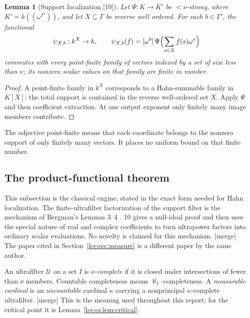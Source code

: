 \documentclass[11pt,letterpaper]{article}
\numberwithin{equation}{section}
\newtheorem{lemma}[theorem]{Lemma}
\theoremstyle{definition}
\theoremstyle{remark}
\newcommand{\coef}[2]{[\omega^{#1}]\,#2}
\newcommand{\leref}[1]{Lemma~\ref{#1}}
\newcommand{\src}[1]{\textup{\textsf{\small[#1]}}}%
\newcommand{\mergetag}{\textup{\textsf{\small[merge]}}}%
\newcommand{\HF}[2]{#1((\omega^{#2}))}
\begin{document}
\begin{lemma}[Support localization \src{10}]\label{lce:mf:lem:local}
Let $\Psi:K\to K'$ be ${<}\nu$-strong, where $K'=\HF k{\Gamma'}$, and let
$X\subseteq\Gamma$ be reverse well ordered. For each $b\in\Gamma'$, the
functional
\begin{equation}\label{lce:mf:eq:localfunctional}
 \psi_{X,b}:k^X\to k,\qquad
 \psi_{X,b}(f)=\coef b{\Psi\Bigl(\sum_{s\in X}f(s)\omega^s\Bigr)}
\end{equation}
commutes with every point-finite family of vectors indexed by a set of size
less than $\nu$; its nonzero scalar values on that family are finite in
number.
\end{lemma}
\begin{proof}
A point-finite family in $k^X$ corresponds to a Hahn-summable family in
$K[X]$: the total support is contained in the reverse well-ordered set $X$.
Apply $\Psi$ and then coefficient extraction. At one output exponent only
finitely many image members contribute.
\end{proof}

The adjective point-finite means that each coordinate belongs to the
nonzero support of only finitely many vectors. It places no uniform bound on
that finite number.

\subsection{The product-functional theorem}
This subsection is the classical engine, stated in the exact form needed for
Hahn localization. The finite-ultrafilter factorization of the support
filter is the mechanism of Bergman's Lemmas 3--4 \cite{BergmanFamilies}. 10
gives a null-ideal proof and then uses the special nature of real and
complex coefficients to turn ultrapower factors into ordinary scalar
evaluations. No novelty is claimed for this mechanism. \mergetag{} The
paper \cite{Bergman} cited in Section~\ref{lce:sec:measure} is a different
paper by the same author.

An ultrafilter $\mathcal U$ on a set $I$ is \emph{$\nu$-complete} if it is
closed under intersections of fewer than $\nu$ members. Countable
completeness means $\aleph_1$-completeness. A \emph{measurable cardinal} is
an \emph{uncountable} cardinal $\kappa$ carrying a nonprincipal
$\kappa$-complete ultrafilter. \mergetag{} This is the meaning used
throughout this report; for the critical point it is
\leref{lce:cs:lem:critical}.
\end{document}

